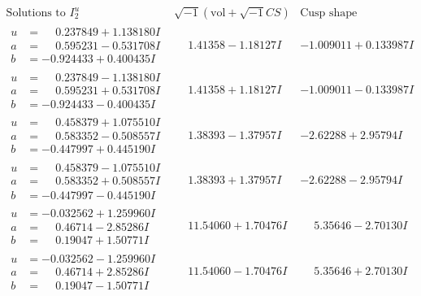 \documentclass[1p]{elsarticle_modified}
\theoremstyle{definition}
\newcommand{\I}{\sqrt{-1}}
\begin{document}
$$\begin{array}{c|c|c}  
\text{Solutions to }I^u_{2}& \I (\text{vol} + \sqrt{-1}CS) & \text{Cusp shape}\\
 \hline 
\begin{aligned}
u &= \phantom{-}0.237849 + 1.138180 I \\
a &= \phantom{-}0.595231 - 0.531708 I \\
b &= -0.924433 + 0.400435 I\end{aligned}
 & \phantom{-}1.41358 - 1.18127 I & -1.009011 + 0.133987 I \\ \hline\begin{aligned}
u &= \phantom{-}0.237849 - 1.138180 I \\
a &= \phantom{-}0.595231 + 0.531708 I \\
b &= -0.924433 - 0.400435 I\end{aligned}
 & \phantom{-}1.41358 + 1.18127 I & -1.009011 - 0.133987 I \\ \hline\begin{aligned}
u &= \phantom{-}0.458379 + 1.075510 I \\
a &= \phantom{-}0.583352 - 0.508557 I \\
b &= -0.447997 + 0.445190 I\end{aligned}
 & \phantom{-}1.38393 - 1.37957 I & -2.62288 + 2.95794 I \\ \hline\begin{aligned}
u &= \phantom{-}0.458379 - 1.075510 I \\
a &= \phantom{-}0.583352 + 0.508557 I \\
b &= -0.447997 - 0.445190 I\end{aligned}
 & \phantom{-}1.38393 + 1.37957 I & -2.62288 - 2.95794 I \\ \hline\begin{aligned}
u &= -0.032562 + 1.259960 I \\
a &= \phantom{-}0.46714 - 2.85286 I \\
b &= \phantom{-}0.19047 + 1.50771 I\end{aligned}
 & \phantom{-}11.54060 + 1.70476 I & \phantom{-}5.35646 - 2.70130 I \\ \hline\begin{aligned}
u &= -0.032562 - 1.259960 I \\
a &= \phantom{-}0.46714 + 2.85286 I \\
b &= \phantom{-}0.19047 - 1.50771 I\end{aligned}
 & \phantom{-}11.54060 - 1.70476 I & \phantom{-}5.35646 + 2.70130 I \\ \hline\begin{aligned}

\end{aligned}
\end{array}$$
\end{document}
